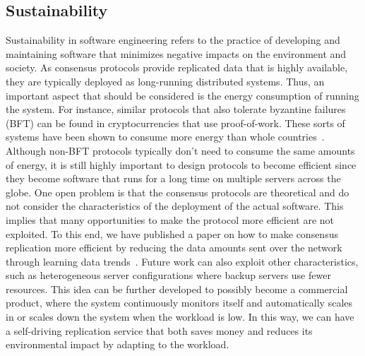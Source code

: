 \documentclass[11pt]{article}
\begin{document}
\subsection{Sustainability}
Sustainability in software engineering refers to the practice of developing and maintaining software that minimizes negative impacts on the environment and society. As consensus protocols provide replicated data that is highly available, they are typically deployed as long-running distributed systems. Thus, an important aspect that should be considered is the energy consumption of running the system. For instance, similar protocols that also tolerate byzantine failures (BFT) can be found in cryptocurrencies that use proof-of-work. These sorts of systems have been shown to consume more energy than whole countries~\cite{huynh2022energy}. Although non-BFT protocols typically don't need to consume the same amounts of energy, it is still highly important to design protocols to become efficient since they become software that runs for a long time on multiple servers across the globe. One open problem is that the consensus protocols are theoretical and do not consider the characteristics of the deployment of the actual software. This implies that many opportunities to make the protocol more efficient are not exploited. To this end, we have published a paper on how to make consensus replication more efficient by reducing the data amounts sent over the network through learning data trends~\cite{ng2023unicache}. Future work can also exploit other characteristics, such as heterogeneous server configurations where backup servers use fewer resources. This idea can be further developed to possibly become a commercial product, where the system continuously monitors itself and automatically scales in or scales down the system when the workload is low. In this way, we can have a self-driving replication service that both saves money and reduces its environmental impact by adapting to the workload.
\end{document}
